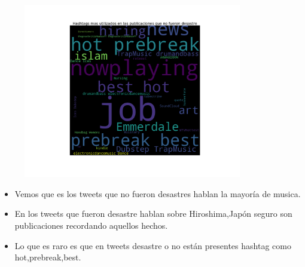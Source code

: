 \documentclass[titlepage,a4paper]{article}
\begin{document}
{\begin{figure}[H]
 \includegraphics[width=0.85\textwidth, height=0.85\textheight, keepaspectratio]{graficos/analisis_hashtags_2.png}
\end{figure}
\begin{itemize}
    \item Vemos que es los tweets que no fueron desastres hablan la mayoría de musica.
    \item En los tweets que fueron desastre hablan sobre Hiroshima,Japón seguro son publicaciones recordando aquellos hechos.
    \item Lo que es raro es que en tweets desastre o no están presentes hashtag como hot,prebreak,best.
\end{itemize}
\par}
\end{document}
